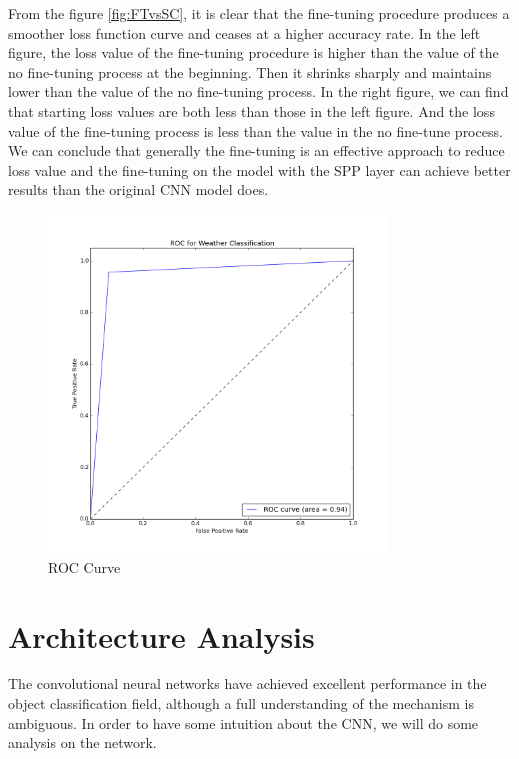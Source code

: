 From the figure \ref{fig:FTvsSC}, it is clear that the fine-tuning procedure produces a smoother loss function curve and ceases at a higher accuracy rate. In the left figure, the loss value of the fine-tuning procedure is higher than the value of the no fine-tuning process at the beginning. Then it shrinks sharply and maintains lower than the value of the no fine-tuning process. In the right figure, we can find that starting loss values are both less than those in the left figure. And the loss value of the fine-tuning process is less than the value in the no fine-tune process. We can conclude that generally the fine-tuning is an effective approach to reduce loss value and the fine-tuning on the model with the SPP layer can achieve better results than the original CNN model does.

\begin{figure}[!htb]
    \centering
	\includegraphics[width=0.8\textwidth]{ROCWeatherClassification.png}
    \caption{ROC Curve}%
    \label{fig:WeatherClassificationROC}%
\end{figure}

\section{Architecture Analysis}

The convolutional neural networks have achieved excellent performance in the object classification field, although a full understanding of the mechanism is ambiguous. In order to have some intuition about the CNN, we will do some analysis on the network.

